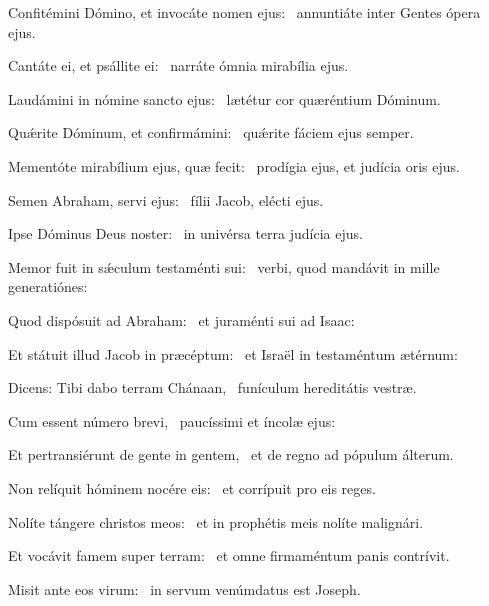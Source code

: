\item Confitémini Dómino, et invocáte nomen ejus:~\psstar{} annuntiáte inter Gentes ópera ejus.

\item Cantáte ei, et psállite ei:~\psstar{} narráte ómnia mirabília ejus.

\item Laudámini in nómine sancto ejus:~\psstar{} lætétur cor quæréntium Dóminum.

\item Quǽrite Dóminum, et confirmámini:~\psstar{} quǽrite fáciem ejus semper.

\item Mementóte mirabílium ejus, quæ fecit:~\psstar{} prodígia ejus, et judícia oris ejus.

\item Semen Abraham, servi ejus:~\psstar{} fílii Jacob, elécti ejus.

\item Ipse Dóminus Deus noster:~\psstar{} in univérsa terra judícia ejus.

\item Memor fuit in sǽculum testaménti sui:~\psstar{} verbi, quod mandávit in mille generatiónes:

\item Quod dispósuit ad Abraham:~\psstar{} et juraménti sui ad Isaac:

\item Et státuit illud Jacob in præcéptum:~\psstar{} et Israël in testaméntum ætérnum:

\item Dicens: Tibi dabo terram Chánaan,~\psstar{} funículum hereditátis vestræ.

\item Cum essent número brevi,~\psstar{} paucíssimi et íncolæ ejus:

\item Et pertransiérunt de gente in gentem,~\psstar{} et de regno ad pópulum álterum.

\item Non relíquit hóminem nocére eis:~\psstar{} et corrípuit pro eis reges.

\item Nolíte tángere christos meos:~\psstar{} et in prophétis meis nolíte malignári.

\item Et vocávit famem super terram:~\psstar{} et omne firmaméntum panis contrívit.

\item Misit ante eos virum:~\psstar{} in servum venúmdatus est Joseph.

